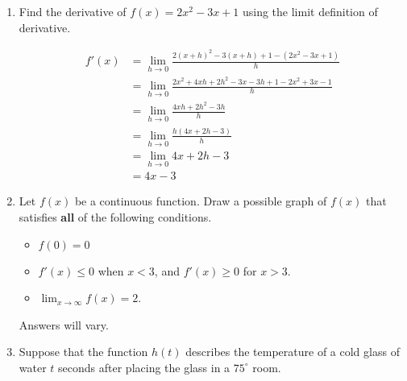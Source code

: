 \documentclass[11pt]{article}
\begin{document}
\drawtitle
\begin{enumerate}

\item Find the derivative of $f(x)=2x^2-3x+1$ using the limit
  definition of derivative.

  \vfill
  {\color{blue}
    \begin{align*}
      f'(x) &= \lim_{h\to 0} \frac{2(x+h)^2-3(x+h)+1-(2x^2-3x+1)}{h}\\
      &= \lim_{h\to 0} \frac{2x^2+4xh+2h^2-3x-3h+1-2x^2+3x-1}{h}\\
      &= \lim_{h\to 0} \frac{4xh+2h^2-3h}{h}\\
      &= \lim_{h\to 0} \frac{h(4x+2h-3)}{h}\\
      &= \lim_{h\to 0} 4x+2h-3\\
      &= 4x-3
    \end{align*}
  }
  \vfill

\item Let $f(x)$ be a continuous function.  Draw a possible graph of
  $f(x)$ that satisfies \textbf{all} of the following conditions.
  \begin{itemize}
  \item $f(0)=0$
  \item $f'(x)\leq 0$ when $x<3$, and $f'(x)\geq 0$ for $x>3$.
  \item $\displaystyle\lim_{x\rightarrow\infty} f(x)=2$.
  \end{itemize}
  \begin{center}
    {\color{blue} Answers will vary.}
  \end{center}


\newpage

\item Suppose that the function $h(t)$ describes the temperature of a
  cold glass of water $t$ seconds after placing the glass in a $75^\circ$ room.
  

\end{enumerate}
\end{document}
